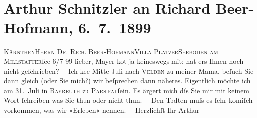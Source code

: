 

         
         \renewcommand{\erwaehntePersonen}{Personen: Richard Beer-Hofmann, Oskar Mayer, Louise Schnitzler}
         \renewcommand{\erwaehnteOrte}{Orte: Bayreuth, I., Innere Stadt, Kärnten, Seeboden, Velden am Wörthersee, Villa Platzer, Wien}
         \renewcommand{\erwaehnteWerke}{Werke: Parsifal}
               \section[Arthur Schnitzler an Richard Beer-Hofmann, 6. 7. 1899]{ Arthur Schnitzler an Richard Beer-Hofmann, 6. 7. 1899}\nopagebreak{}\rehead{ }\begin{ledgroupsized}[t]{13cm}\normalsize\beginnumbering \toendnotes[C]{\smallbreak\pagebreak[2]} 
\toendnotes[C]{\smallbreak}\pstart{}{\pb}\textsc{Kärnthen}\pend{}\pstart{}\textsc{Herrn Dr. Rich. Beer-Hofmann}\pend{}\pstart{}\textsc{Villa Platzer}\pend{}\pstart{}\textsc{Seeboden am Millstätter}ſee\pend{}{\bigskip}\pstart
           \raggedleft{}{\pb}6/7 99\pend
           \pstart
           lieber, Mayer ko{\geminationm}t ja
               keineswegs mit; hat ers Ihnen noch nicht geſchrieben?\pend
           \pstart
           – Ich ko{\geminationm}e Mitte Juli nach \textsc{Velden} zu meiner Mama, beſuch
               Sie dann gleich (oder Sie mich?) wir beſprechen dann näheres.\pend
           \pstart
           Eigentlich möchte ich am {\pb}31. Juli in \textsc{Bayreuth} zu \textsc{Parsifal}ſein.\pend
           \pstart
           Es ärgert mich dſs Sie mir mit keinem Wort ſchreiben was Sie thun oder nicht
               thun.\pend
           \pstart
           – Den Todten muſs es ſehr komiſch vorkommen, was wir »Erleben« nennen. – \pend
           \pstart Herzlichſt Ihr \spacefill\mbox{Arthur}\pend{}
         
         \endnumbering{}\end{ledgroupsized}  \newcommand{\dateiname}{L00933}\newcommand{\titel}{Arthur Schnitzler an Richard Beer-Hofmann, 6. 7. 1899}\newcommand{\editorInnen}{Martin Anton Müller und Gerd-Hermann Susen}
      